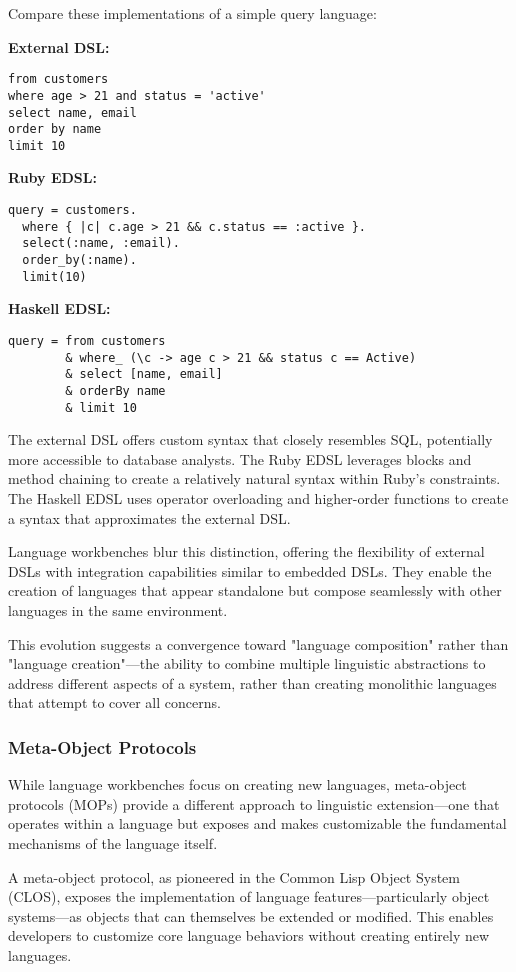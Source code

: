 \documentclass[11pt]{article}
\begin{document}
Compare these implementations of a simple query language:

\textbf{\textbf{External DSL:}}
\begin{verbatim}
from customers
where age > 21 and status = 'active'
select name, email
order by name
limit 10
\end{verbatim}

\textbf{\textbf{Ruby EDSL:}}
\begin{verbatim}
query = customers.
  where { |c| c.age > 21 && c.status == :active }.
  select(:name, :email).
  order_by(:name).
  limit(10)
\end{verbatim}

\textbf{\textbf{Haskell EDSL:}}
\begin{verbatim}
query = from customers
        & where_ (\c -> age c > 21 && status c == Active)
        & select [name, email]
        & orderBy name
        & limit 10
\end{verbatim}

The external DSL offers custom syntax that closely resembles SQL, potentially more accessible to database analysts. The Ruby EDSL leverages blocks and method chaining to create a relatively natural syntax within Ruby's constraints. The Haskell EDSL uses operator overloading and higher-order functions to create a syntax that approximates the external DSL.

Language workbenches blur this distinction, offering the flexibility of external DSLs with integration capabilities similar to embedded DSLs. They enable the creation of languages that appear standalone but compose seamlessly with other languages in the same environment.

This evolution suggests a convergence toward "language composition" rather than "language creation"—the ability to combine multiple linguistic abstractions to address different aspects of a system, rather than creating monolithic languages that attempt to cover all concerns.
\subsubsection{Meta-Object Protocols}
\label{sec:org9468fd6}

While language workbenches focus on creating new languages, meta-object protocols (MOPs) provide a different approach to linguistic extension—one that operates within a language but exposes and makes customizable the fundamental mechanisms of the language itself.

A meta-object protocol, as pioneered in the Common Lisp Object System (CLOS), exposes the implementation of language features—particularly object systems—as objects that can themselves be extended or modified. This enables developers to customize core language behaviors without creating entirely new languages.
\end{document}
